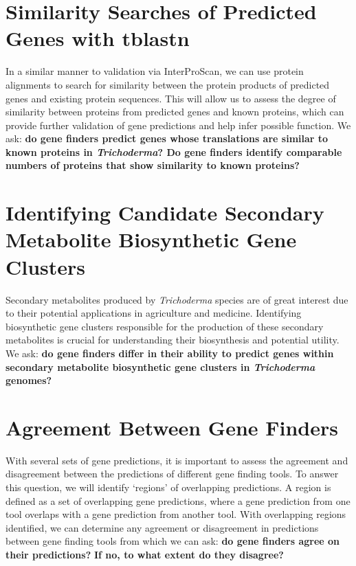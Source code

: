 \section{Similarity Searches of Predicted Genes with tblastn}
\label{rq:tblastn}
In a similar manner to validation via InterProScan, we can use protein alignments to search for similarity between the protein products of predicted genes and existing protein sequences. This will allow us to assess the degree of similarity between proteins from predicted genes and known proteins, which can provide further validation of gene predictions and help infer possible function. We ask: \textbf{do gene finders predict genes whose translations are similar to known proteins in \textit{Trichoderma}? Do gene finders identify comparable numbers of proteins that show similarity to known proteins?}

\section{Identifying Candidate Secondary Metabolite Biosynthetic Gene Clusters}
\label{rq:secondary-metabolites}
Secondary metabolites produced by \textit{Trichoderma} species are of great interest due to their potential applications in agriculture and medicine. Identifying biosynthetic gene clusters responsible for the production of these secondary metabolites is crucial for understanding their biosynthesis and potential utility. We ask: \textbf{do gene finders differ in their ability to predict genes within secondary metabolite biosynthetic gene clusters in \textit{Trichoderma} genomes?}

\section{Agreement Between Gene Finders} 
\label{identify-regions}
With several sets of gene predictions, it is important to assess the agreement and disagreement between the predictions of different gene finding tools. To answer this question, we will identify `regions' of overlapping predictions. A 
region is defined as a set of overlapping gene predictions, where a gene prediction from one tool overlaps with a gene prediction from another tool.
With overlapping regions identified, we can determine any agreement or disagreement in predictions between gene finding tools
from which we can ask: \textbf{do gene finders agree on their
  predictions?} \textbf{If no, to what extent do they disagree?}

